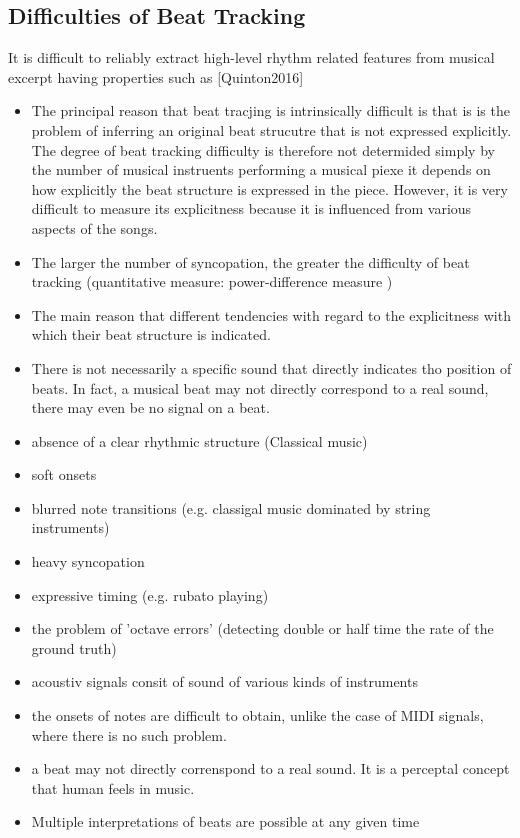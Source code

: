 \documentclass{scrartcl}
\begin{document}
\subsection{Difficulties of Beat Tracking}
\label{sec:difficulties}
It is difficult to reliably extract high-level rhythm related features from musical excerpt having properties such as [Quinton2016]
\begin{itemize}
\item The principal reason that beat tracjing is intrinsically difficult is that is is the problem of inferring an original beat strucutre that is not expressed explicitly. The degree of beat tracking difficulty is therefore not determided simply by the number of musical instruents performing a musical piexe it depends on how explicitly the beat structure is expressed in the piece. However, it is very difficult to measure its explicitness because it is influenced from various aspects of the songs.
\item The larger the number of syncopation, the greater the difficulty of beat tracking (quantitative measure: power-difference measure \cite{Goto1999})
\item The main reason that different tendencies with regard to the explicitness with which their beat structure is indicated.
\item There is not necessarily a specific sound that directly indicates tho position of beats. In fact, a musical beat may not directly correspond to a real sound, there may even be no signal on a beat. 
\item absence of a clear rhythmic structure (Classical music)
\item soft onsets
\item blurred note transitions (e.g. classigal music dominated by string instruments)
\item heavy syncopation
\item expressive timing (e.g. rubato playing)
\item the problem of 'octave errors' (detecting double or half time the rate of the ground truth)
\item acoustiv signals consit of sound of various kinds of instruments
\item the onsets of notes are difficult to obtain, unlike the case of MIDI signals, where there is no such problem.
\item a beat may not directly correnspond to a real sound. It is a perceptal concept that human feels in music. 
\item Multiple interpretations of beats are possible at any given time

\end{itemize}
\end{document}
